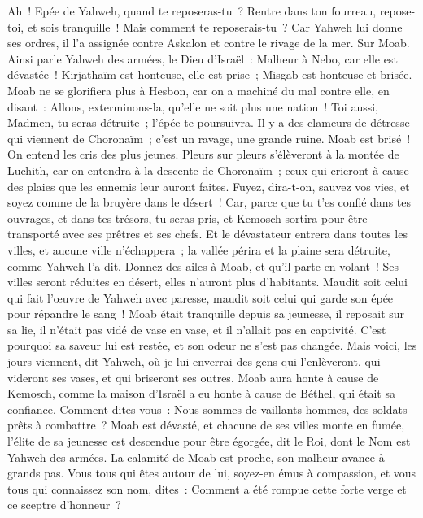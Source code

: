 \begin{multicols}{2}
Ah~! Epée de Yahweh, quand te reposeras-tu~? Rentre dans ton fourreau, repose-toi, et sois tranquille~!
Mais comment te reposerais-tu~? Car Yahweh lui donne ses ordres, il l'a assignée contre Askalon et contre le rivage de la mer.
\VerseOne{}Sur Moab. Ainsi parle Yahweh des armées, le Dieu d'Israël~: Malheur à Nebo, car elle est dévastée~! Kirjathaïm est honteuse, elle est prise~; Misgab est honteuse et brisée.
Moab ne se glorifiera plus à Hesbon, car on a machiné du mal contre elle, en disant~: Allons, exterminons-la, qu'elle ne soit plus une nation~! Toi aussi, Madmen, tu seras détruite~; l'épée te poursuivra.
Il y a des clameurs de détresse qui viennent de Choronaïm~; c'est un ravage, une grande ruine.
Moab est brisé~! On entend les cris des plus jeunes.
Pleurs sur pleurs s'élèveront à la montée de Luchith, car on entendra à la descente de Choronaïm~; ceux qui crieront à cause des plaies que les ennemis leur auront faites.
Fuyez, dira-t-on, sauvez vos vies, et soyez comme de la bruyère dans le désert~!
Car, parce que tu t'es confié dans tes ouvrages, et dans tes trésors, tu seras pris, et Kemosch sortira pour être transporté avec ses prêtres et ses chefs.
Et le dévastateur entrera dans toutes les villes, et aucune ville n'échappera~; la vallée périra et la plaine sera détruite, comme Yahweh l'a dit.
Donnez des ailes à Moab, et qu'il parte en volant~! Ses villes seront réduites en désert, elles n'auront plus d'habitants.
Maudit soit celui qui fait l'œuvre de Yahweh avec paresse, maudit soit celui qui garde son épée pour répandre le sang~!
Moab était tranquille depuis sa jeunesse, il reposait sur sa lie, il n'était pas vidé de vase en vase, et il n'allait pas en captivité. C'est pourquoi sa saveur lui est restée, et son odeur ne s'est pas changée.
Mais voici, les jours viennent, dit Yahweh, où je lui enverrai des gens qui l'enlèveront, qui videront ses vases, et qui briseront ses outres.
Moab aura honte à cause de Kemosch, comme la maison d'Israël a eu honte à cause de Béthel, qui était sa confiance.
Comment dites-vous~: Nous sommes de vaillants hommes, des soldats prêts à combattre~?
Moab est dévasté, et chacune de ses villes monte en fumée, l'élite de sa jeunesse est descendue pour être égorgée, dit le Roi, dont le Nom est Yahweh des armées.
La calamité de Moab est proche, son malheur avance à grands pas.
Vous tous qui êtes autour de lui, soyez-en émus à compassion, et vous tous qui connaissez son nom, dites~: Comment a été rompue cette forte verge et ce sceptre d'honneur~?

\end{multicols}
